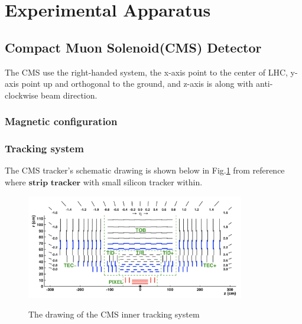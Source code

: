 

\clearpage
\section{Experimental Apparatus}
\label{sec:ExperimentalAppratus}

	\subsection{Compact Muon Solenoid(CMS) Detector}
	\label{ssec:ExpApp_CMS}

		The CMS use the right-handed system, the x-axis point to the center of LHC, y-axis point up and orthogonal to the ground, and z-axis is along with anti-clockwise beam direction.

		\subsubsection{Magnetic configuration}
		\label{sssec:ExpApp_magnetic}


		\subsubsection{Tracking system}
		\label{sssec:ExpApp_tracking}

			The CMS tracker's schematic drawing is shown below in Fig.\ref{PhysObj:fig:tracker} from reference\cite{Chatrchyan:2014fea} where $\textbf{strip tracker}$ with small silicon tracker within. 

			\begin{figure}[H]
			\centering{}
		    	\includegraphics[width=0.85\textwidth]{Figures/ExpApparatus/tracker.png}\\
			\caption{The drawing of the CMS inner tracking system\cite{Chatrchyan:2014fea}}
			\label{PhysObj:fig:tracker}
			\end{figure}
			\FloatBarrier

